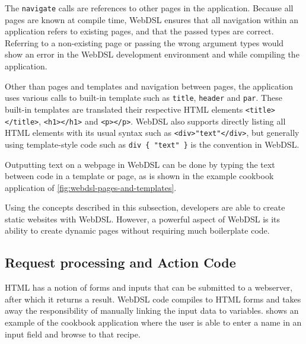       The \texttt{navigate} calls are references to other pages in the application. Because all pages are known at compile time, WebDSL ensures that all navigation within an application refers to existing pages, and that the passed types are correct. Referring to a non-existing page or passing the wrong argument types would show an error in the WebDSL development environment and while compiling the application.
      
      Other than pages and templates and navigation between pages, the application uses various calls to built-in template such as \texttt{title}, \texttt{header} and \texttt{par}. These built-in templates are translated their respective HTML elements \texttt{<title></title>}, \texttt{<h1></h1>} and \texttt{<p></p>}. WebDSL also supports directly listing all HTML elements with its usual syntax such as \texttt{<div>"text"</div>}, but generally using template-style code such as \texttt{div \{ "text" \}} is the convention in WebDSL.

      Outputting text on a webpage in WebDSL can be done by typing the text between code in a template or page, as is shown in the example cookbook application of \cref{fig:webdsl-pages-and-templates}.

      Using the concepts described in this subsection, developers are able to create static websites with WebDSL. However, a powerful aspect of WebDSL is its ability to create dynamic pages without requiring much boilerplate code.

    \subsection{\label{subsec:request-processing}Request processing and Action Code}

      HTML has a notion of forms and inputs that can be submitted to a webserver, after which it returns a result. WebDSL code compiles to HTML forms and takes away the responsibility of manually linking the input data to variables.  shows an example of the cookbook application where the user is able to enter a name in an input field and browse to that recipe.

